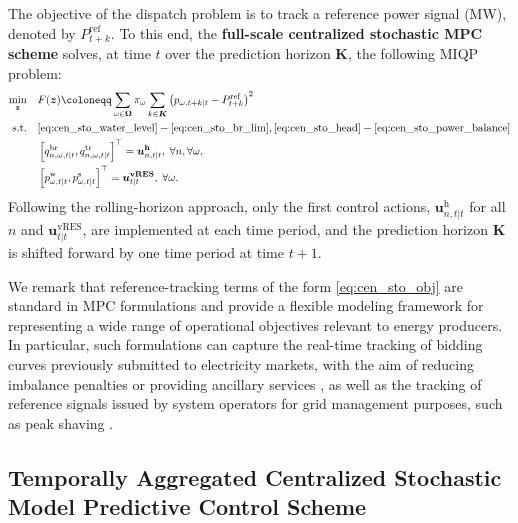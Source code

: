 \documentclass[a4paper,fleqn]{cas-sc}
\begin{document}
The objective of the dispatch problem is to track a reference power signal (MW), denoted by $P^{\mathrm{ref}}_{t+k}$.
To this end, the \textbf{full-scale centralized stochastic MPC scheme} solves, at time $t$ over the prediction horizon $\boldsymbol{K}$, the following MIQP problem:
\begin{subequations}
\label{eq:cen_sto_MPC}
\begin{align}
\min_{\boldsymbol{z}} \quad & F(\boldsymbol{z}) \coloneqq \sum_{\omega \in \boldsymbol{\Omega}} \pi_{\omega} \sum_{k \in \boldsymbol{K}} \left( p_{\omega, t+k|t} - P^{\mathrm{ref}}_{t+k} \right)^2 \label{eq:cen_sto_obj}\\
\text{s.t.} \quad & \eqref{eq:cen_sto_water_level}-\eqref{eq:cen_sto_br_lim}, \eqref{eq:cen_sto_head}-\eqref{eq:cen_sto_power_balance}\\
& \left[
q^{\mathrm{br}}_{n,\omega,t|t},
q^{\mathrm{tr}}_{n,\omega,t|t}
\right]^\top = \boldsymbol{u}^{\boldsymbol{\mathrm{h}}}_{n, t|t}, \; \forall n, \forall \omega, \label{eq:cen_sto_MPC_control_hydro}\\
& \left[
p^{\mathrm{w}}_{\omega, t|t},
p^{\mathrm{s}}_{\omega, t|t}
\right]^\top = \boldsymbol{u}^{\boldsymbol{\mathrm{vRES}}}_{t|t}, \; \forall \omega. \label{eq:cen_sto_MPC_control_vres}
\end{align}
\end{subequations}
Following the rolling-horizon approach, only the first control actions,
$\boldsymbol{u}^{\boldsymbol{\mathrm{h}}}_{n,t|t}$ for all $n$ and $\boldsymbol{u}^{\boldsymbol{\mathrm{vRES}}}_{t|t}$,
are implemented at each time period, and the prediction horizon $\boldsymbol{K}$ is shifted forward by one time period at time $t+1$.

We remark that reference-tracking terms of the form \eqref{eq:cen_sto_obj} are standard in MPC formulations \citep{bordons2019model} and provide a flexible modeling framework for representing a wide range of operational objectives relevant to energy producers.
In particular, such formulations can capture the real-time tracking of bidding curves previously submitted to electricity markets, with the aim of reducing imbalance penalties or providing ancillary services \citep{santosuosso2024stochastic},
as well as the tracking of reference signals issued by system operators for grid management purposes, such as peak shaving \citep{dongol2018model}.

\subsection{Temporally Aggregated Centralized Stochastic Model Predictive Control Scheme}
\label{subsec:SMPC_TSA}
\end{document}
